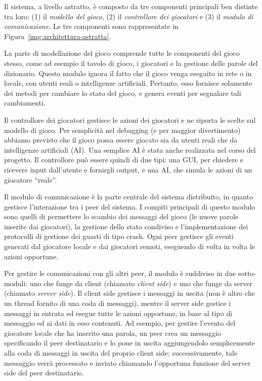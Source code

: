 \documentclass[9pt]{article}
\begin{document}
Il sistema, a livello astratto, è composto da tre componenti principali ben distinte tra loro: (1) il \emph{modello del gioco}, (2) il \emph{controllore dei giocatori} e (3) il \emph{modulo di comunicazione}. Le tre componenti sono rappresentate in Figura~\ref{img:architettura-astratta}.

La parte di modellazione del gioco comprende tutte le componenti del gioco stesso, come ad esempio il tavolo di gioco, i giocatori e la gestione delle parole del dizionario.
Questo modulo ignora il fatto che il gioco venga eseguito in rete o in locale, con utenti reali o intelligenze artificiali.
Pertanto, esso fornisce solamente dei metodi per cambiare lo stato del gioco, e genera eventi per segnalare tali cambiamenti.

Il controllore dei giocatori gestisce le azioni dei giocatori e ne riporta le scelte sul modello di gioco. Per semplicità nel debugging (e per maggior divertimento) abbiamo previsto che il gioco possa essere giocato sia da utenti reali che da intelligenze artificiali (AI). Una semplice AI è stata anche realizzata nel corso del progetto. Il controllore può essere quindi di due tipi: una GUI, per chiedere e ricevere input dall'utente e fornirgli output, e una AI, che simula le azioni di un giocatore ``reale''.

Il modulo di comunicazione è la parte centrale del sistema distribuito, in quanto gestisce l'interazione tra i peer del sistema. I compiti principali di questo modulo sono quelli di permettere lo scambio dei messaggi del gioco (le nuove parole inserite dai giocatori), la gestione dello stato condiviso e l'implementazione dei protocolli di gestione dei guasti di tipo crash.
Ogni peer gestisce gli eventi generati dal giocatore locale e dai giocatori remoti, eseguendo di volta in volta le azioni opportune.

Per gestire le comunicazioni con gli altri peer, il modulo è suddiviso in due sotto-moduli: uno che funge da client (chiamato \emph{client side}) e uno che funge da server (chiamato \emph{server side}). Il client side gestisce i messaggi in uscita (non è altro che un thread fornito di una coda di messaggi), mentre il server side gestice i messaggi in entrata ed esegue tutte le azioni opportune, in base al tipo di messaggio ed ai dati in esso contenuti. 
Ad esempio, per gestire l'evento del giocatore locale che ha inserito una parola, un peer crea un messaggio specificando il peer destinatario e lo pone in uscita aggiungendolo semplicemente alla coda di messaggi in uscita del proprio client side; successivamente, tale messaggio verrà processato e inviato chiamando l'opportuna funzione del server side del peer destinatario.
\end{document}
